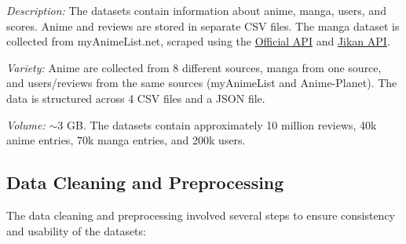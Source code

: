 \vspace{\baselineskip}

\textit{Description:} The datasets contain information about anime, manga, users, and scores. 
Anime and reviews are stored in separate CSV files. The manga dataset is collected from myAnimeList.net, 
scraped using the \href{https://myanimelist.net/apiconfig/references/api/v2}{Official API} and \href{https://docs.api.jikan.moe/}{Jikan API}.

\vspace{\baselineskip}

\textit{Variety:} Anime are collected from 8 different sources, manga from one source, 
and users/reviews from the same sources (myAnimeList and Anime-Planet). 
The data is structured across 4 CSV files and a JSON file.

\vspace{\baselineskip}

\textit{Volume:} $\sim$3 GB\@. The datasets contain approximately 10 million reviews, 40k anime entries, 70k manga entries, 
and 200k users.

\subsection{Data Cleaning and Preprocessing}

The data cleaning and preprocessing involved several steps to ensure consistency and usability of the datasets:

